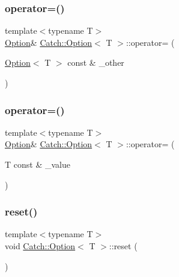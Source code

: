 \mbox{\label{class_catch_1_1_option_a78c65b15dd6b2fbd04c5012c43017c8f}} 
\subsubsection{\texorpdfstring{operator=()}{operator=()}\hspace{0.1cm}{\footnotesize\ttfamily [1/2]}}
{\footnotesize\ttfamily template$<$typename T$>$ \\
\hyperlink{class_catch_1_1_option}{Option}\& \hyperlink{class_catch_1_1_option}{Catch\+::\+Option}$<$ T $>$\+::operator= (\begin{DoxyParamCaption}\item[{\hyperlink{class_catch_1_1_option}{Option}$<$ T $>$ const \&}]{\+\_\+other }\end{DoxyParamCaption})\hspace{0.3cm}{\ttfamily [inline]}}

\mbox{\label{class_catch_1_1_option_a2be7e343ab22d6061726d32ab4622653}} 
\subsubsection{\texorpdfstring{operator=()}{operator=()}\hspace{0.1cm}{\footnotesize\ttfamily [2/2]}}
{\footnotesize\ttfamily template$<$typename T$>$ \\
\hyperlink{class_catch_1_1_option}{Option}\& \hyperlink{class_catch_1_1_option}{Catch\+::\+Option}$<$ T $>$\+::operator= (\begin{DoxyParamCaption}\item[{T const \&}]{\+\_\+value }\end{DoxyParamCaption})\hspace{0.3cm}{\ttfamily [inline]}}

\mbox{\label{class_catch_1_1_option_a37b4e0e5d4d56296adacd267a616f4e0}} 
\subsubsection{\texorpdfstring{reset()}{reset()}}
{\footnotesize\ttfamily template$<$typename T$>$ \\
void \hyperlink{class_catch_1_1_option}{Catch\+::\+Option}$<$ T $>$\+::reset (\begin{DoxyParamCaption}{ }\end{DoxyParamCaption})\hspace{0.3cm}{\ttfamily [inline]}}

